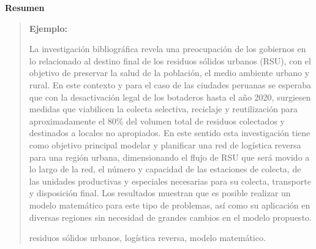 \newpage
\begin{center}
 {\bf\LARGE Resumen}
\end{center} 
\vskip 0.5cm
\begin{quotation}
{\bf Ejemplo:}\par

La investigación bibliográfica revela una preocupación de los gobiernos en lo relacionado al destino final de los residuos sólidos urbanos (RSU), con el objetivo de preservar la salud de la población, el medio ambiente urbano y rural. En este contexto y para el caso de las ciudades peruanas se esperaba que con la desactivación legal de los botaderos hasta el año 2020, surgiesen medidas que viabilicen la colecta selectiva, reciclaje y reutilización para aproximadamente el $80\%$ del volumen total de residuos colectados y destinados a locales no apropiados. 
\vskip 0.2cm 
En este sentido esta investigación tiene como objetivo principal modelar y planificar una red de logística reversa para una región urbana, dimensionando el flujo de RSU que será movido a lo largo de la red, el número y capacidad de las estaciones de colecta, de las unidades productivas y especiales necesarias para su colecta, transporte y disposición final. Los resultados muestran que es posible realizar un modelo matemático para este tipo de problemas, así como su aplicación en diversas regiones sin necesidad de grandes cambios en el modelo propuesto.    

\vskip 0.3cm
\hspace*{-0.6cm}{\bf Palabras claves:} residuos sólidos urbanos, logística reversa, modelo matemático.
\end{quotation}


